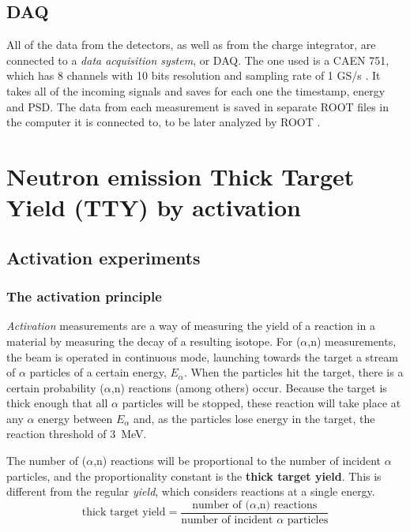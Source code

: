\documentclass[a4paper,12pt]{report}
\newcommand{\an}{($\alpha$,n) }
\begin{document}
\section{DAQ}
All of the data from the detectors, as well as from the charge integrator, are connected to a \textit{data acquisition system}, or DAQ.
The one used is a CAEN 751, which has 8 channels with 10 bits resolution and sampling rate of 1 GS/s \cite{CAEN}.
It takes all of the incoming signals and saves for each one the timestamp, energy and PSD.
The data from each measurement is saved in separate ROOT files in the computer it is connected to, to be later analyzed by ROOT \cite{ROOT}.


\chapter{Neutron emission Thick Target Yield (TTY) by activation}

\section{Activation experiments}

\subsection{The activation principle}
\textit{Activation} measurements are a way of measuring the yield of a reaction in a material by measuring the decay of a resulting isotope.
For \an measurements, the beam is operated in continuous mode, launching towards the target a stream of $\alpha$ particles of a certain energy, $E_\alpha$.
When the particles hit the target, there is a certain probability \an reactions (among others) occur.
Because the target is thick enough that all $\alpha$ particles will be stopped, these reaction will take place at any $\alpha$ energy between $E_\alpha$ and, as the particles lose energy in the target, the reaction threshold of \qty{3}{\MeV}.

The number of \an reactions will be proportional to the number of incident $\alpha$ particles, and the proportionality constant is the \textbf{thick target yield}.
This is different from the regular \textit{yield}, which considers reactions at a single energy.
\begin{equation}
	\text{thick target yield} = \frac{\text{number of \an reactions}}{\text{number of incident $\alpha$ particles}}
	\label{tty_def}
\end{equation}
\end{document}
